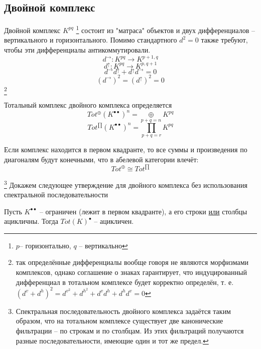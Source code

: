 \documentclass[../main.tex]{subfiles}
\begin{document}
\subsection{Двойной комплекс}
\begin{to_def}\label{double_complex}
Двойной комплекс $K^{pq}$ \footnote{$p$-- горизонтально, $q$ -- вертикально} состоит из "матраса" объектов и двух дифференциалов -- вертикального и горизонтального. Помимо стандартного  $d^2=0$ также требуют, чтобы эти дифференциалы антикоммутировали.
\[d^{\rightarrow}\colon K^{pq}\to K^{p+1, q}\]
\[d^{\uparrow}\colon K^{pq}\to K^{p, q+1}\]
\[d^{\rightarrow}d^{\uparrow} + d^{\uparrow}d^{\rightarrow} = 0\]
\[(d^{\rightarrow})^2 = (d^{\uparrow})^2 = 0\]\footnote{так определённые дифференциалы вообще говоря не являются морфизмами комплексов, однако соглашение о знаках гарантирует, что индуцированный дифференциал в тотальном комплексе будет корректно определён, т. е. $(d^v + d^h)^2 = d^v^2 + d^h^2 + d^v d^h + d^h d^v = 0 $}
\end{to_def}
\begin{to_def}
Тотальный комплекс двойного комплекса определяется
\[Tot^{\oplus}(K^{\bullet\bullet})^n = \underset{p+q=n}{\oplus}K^{pq}\]
\[Tot^{\prod}(K^{\bullet\bullet})^n = \underset{p+q=r}{\prod}K^{pq}\]
\end{to_def}
\begin{to_claim}
Если комплекс находится в первом квадранте, то все суммы и произведения по диагоналям будут конечными, что в абелевой категории влечёт:
\[Tot^{\oplus} \cong Tot^{\prod}\]
\end{to_claim}
\footnote{Спектральная последовательность двойного комплекса задаётся таким образом, что на тотальном комплексе существует две канонические фильтрации -- по строкам и по столбцам. Из этих фильтраций получаются разные последовательности, имеющие один и тот же предел.}
Докажем следующее утверждение для двойного комплекса без использования спектральной последовательности
\begin{to_claim}
Пусть $K^{\bullet\bullet}$ -- ограничен (лежит в первом квадранте), а его строки \underline{или} столбцы ацикличны. Тогда $Tot(K)^\bullet$ -- ацикличен.
\end{to_claim}
\end{document}
